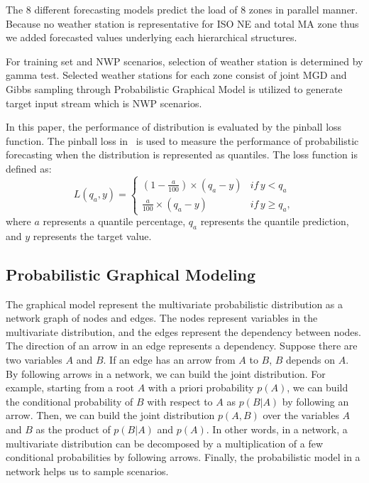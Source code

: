 \documentclass[journal]{IEEEtran} %
\begin{document}
The 8 different forecasting models predict the load of 8 zones in parallel manner. Because no weather station is representative for ISO NE and total MA zone thus we added forecasted values underlying each hierarchical structures. 

For training set and NWP scenarios, selection of weather station is determined by gamma test. Selected weather stations for each zone consist of joint MGD and Gibbs sampling through Probabilistic Graphical Model is utilized to generate target input stream which is NWP scenarios.


 In this paper, the performance of distribution is evaluated by the pinball loss function. The pinball loss in~\cite{Hong2016} is used to measure the performance of probabilistic forecasting when the distribution is represented as quantiles. The loss function is defined as:
\begin{equation}
L({q_a},y) = \left\{ {\begin{array}{*{20}{c}}
  {(1 - \frac{a}{{100}}) \times ({q_a} - y)}&{if\,y < {q_a}} \\ 
  {\frac{a}{{100}} \times ({q_a} - y)}&{if\,y \geq {q_a}},
\end{array}} \right.
\end{equation}
where $a$ represents a quantile percentage, $q_a$ represents the quantile prediction, and $y$ represents the target value.




\subsection{Probabilistic Graphical Modeling}

The  graphical model represent the multivariate probabilistic distribution as a network graph of nodes and edges. 
The nodes represent variables in the multivariate distribution, and the edges represent the dependency between nodes. The direction of an arrow in an edge represents a dependency. Suppose there are two variables $A$ and $B$. If an edge has an arrow from $A$ to $B$, $B$ depends on $A$. By following arrows in a network, we can build the joint distribution. For example, starting from a root $A$ with a priori probability $p(A)$, we can build the conditional probability of $B$ with respect to $A$ as $p(B|A)$ by following an arrow. Then, we can build the joint distribution $p(A,B)$ over the variables $A$ and $B$ as the product of $p(B|A)$ and $p(A)$. In other words, in a network, a multivariate distribution can be decomposed by a multiplication of a few conditional probabilities by following arrows. Finally, the probabilistic model in a network helps us to sample scenarios.  
\end{document}
